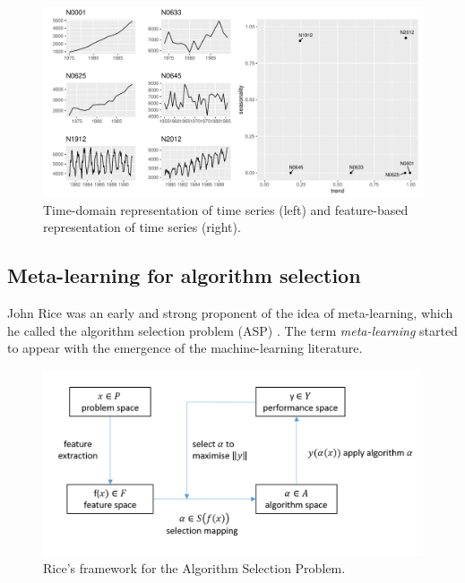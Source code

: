 \documentclass[11pt,a4paper,]{article}
\begin{document}
\begin{figure}

{\centering \includegraphics[width=\textwidth]{figure/fig1-1} 

}

\caption{Time-domain representation of time series (left) and feature-based representation of time series (right).}\label{fig:fig1}
\end{figure}

\hypertarget{meta-learning-for-algorithm-selection}{%
\subsection{Meta-learning for algorithm selection}\label{meta-learning-for-algorithm-selection}}

John Rice was an early and strong proponent of the idea of meta-learning, which he called the algorithm selection problem (ASP) \autocite{rice1976}. The term \emph{meta-learning} started to appear with the emergence of the machine-learning literature.

\begin{figure}

{\centering \includegraphics[width=0.6\linewidth]{images/RiceFramework} 

}

\caption{Rice's framework for the Algorithm Selection Problem.}\label{fig:rice}
\end{figure}
\end{document}
